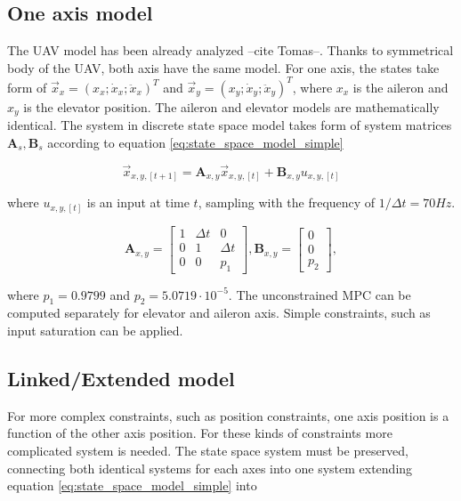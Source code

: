 \documentclass{article}
\begin{document}
\subsection{One axis model}
The UAV model has been already analyzed --cite Tomas--. Thanks to symmetrical body of the UAV, both axis have the same model. For one axis, the states take form of 
$\vec{x}_x = (x_x; \dot{x}_x; \ddot{x}_x)^T$ and $\vec{x}_y = (x_y; \dot{x}_y; \ddot{x}_y)^T$, where $x_x$ is the aileron and $x_y$ is the elevator position. The aileron and elevator models are mathematically identical. The system in discrete state space model takes form of system matrices $\textbf{A}_s, \textbf{B}_s$ according to equation \ref{eq:state_space_model_simple}

\begin{equation}
\label{eq:state_space_model_simple}
\vec{x}_{x,y,[t+1]} = \textbf{A}_{x,y} \vec{x}_{x,y, [t]} +\textbf{B}_{x,y} u_{x,y, [t]}
\end{equation}

where $u_{x,y,[t]}$ is an input at time $t$, sampling with the frequency of $1/\Delta t = 70Hz$.




\begin{equation}
\textbf{A}_{x,y} =
  \begin{bmatrix}
  1 & \Delta t & 		0 \\
  0 & 		 1 & \Delta t \\
  0	& 		 0 &		p_1
  \end{bmatrix},\textbf{B}_{x,y} = \begin{bmatrix}
  0 \\
  0 \\
  p_2
  \end{bmatrix}, 
\end{equation}

where $p_1 = 0.9799$ and $p_2 = 5.0719\cdot10^{-5}$. The unconstrained MPC can be computed separately for elevator and aileron axis. Simple constraints, such as input saturation can be applied.

\subsection{{\color{red} Linked/Extended} model}		%
For more complex constraints, such as position constraints, one axis position is a function of the other axis position. For these kinds of constraints more complicated system is needed. The state space system must be preserved, connecting both identical systems for each axes into one system extending equation \ref{eq:state_space_model_simple} into 
\end{document}
